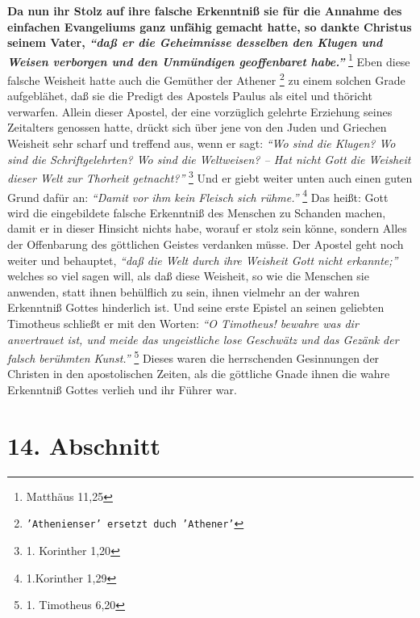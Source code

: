 \textbf{Da nun ihr Stolz auf ihre falsche Erkenntniß sie für die Annahme des einfachen
Evangeliums ganz unfähig gemacht hatte, so dankte Christus seinem Vater,
\textit{"`daß er die Geheimnisse desselben den Klugen und Weisen verborgen und den Unmündigen geoffenbaret habe."'}}
\footnote{Matthäus 11,25}
Eben diese falsche Weisheit hatte
auch die Gemüther der Athener \footnote{\texttt{'Athenienser' ersetzt duch 'Athener'}} zu einem solchen Grade aufgeblähet, daß sie
die Predigt des Apostels Paulus als eitel und thöricht verwarfen. Allein dieser
Apostel, der eine vorzüglich gelehrte Erziehung seines Zeitalters genossen
hatte, drückt sich über jene von den Juden und Griechen
Weisheit sehr scharf und treffend aus, wenn er sagt:
\textit{"`Wo sind die Klugen? Wo
sind die Schriftgelehrten? Wo sind die Weltweisen? -- Hat nicht Gott die
Weisheit dieser Welt zur Thorheit getnacht?"'}
\footnote{1. Korinther 1,20}
Und er
giebt weiter unten auch einen guten Grund dafür an:
\textit{"`Damit vor ihm kein Fleisch sich rühme."'}
\footnote{1.Korinther 1,29}
Das heißt: Gott wird die eingebildete
falsche Erkenntniß des Menschen zu Schanden machen, damit er in dieser Hinsicht
nichts habe, worauf er stolz sein könne, sondern Alles der Offenbarung des
göttlichen Geistes verdanken müsse. Der Apostel geht noch weiter und behauptet,
\textit{"`daß die Welt durch ihre Weisheit Gott nicht erkannte;"'}
welches so viel sagen
will, als daß diese Weisheit, so wie die Menschen sie anwenden, statt ihnen
behülflich zu sein, ihnen vielmehr an der wahren Erkenntniß Gottes hinderlich
ist. Und seine erste Epistel an seinen geliebten Timotheus schließt er mit den
Worten:
\textit{"`O Timotheus! bewahre was dir anvertrauet ist, und meide das
ungeistliche lose Geschwätz und das Gezänk der falsch berühmten
Kunst."'}
\footnote{1. Timotheus 6,20}
Dieses waren die herrschenden Gesinnungen der
Christen in den apostolischen Zeiten, als die göttliche Gnade ihnen die wahre
Erkenntniß Gottes verlieh und ihr Führer war.

\section{14. Abschnitt} \label{kap7_ab14}

